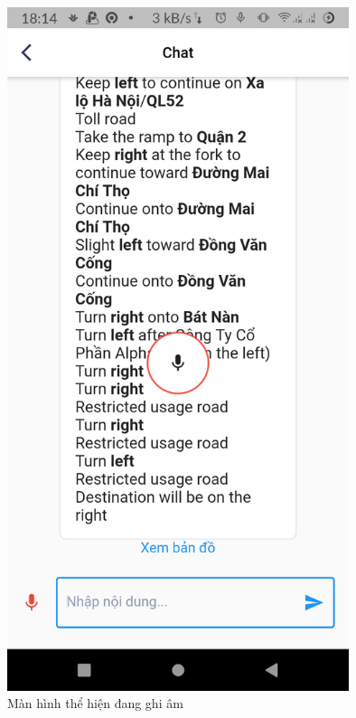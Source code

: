 \begin{figure}[htp]
    \centering
    \includegraphics[width=10cm]{images/Screen-record.png}
    \caption{Màn hình thể hiện đang ghi âm}
    \label{fig:screen-record}
\end{figure}

